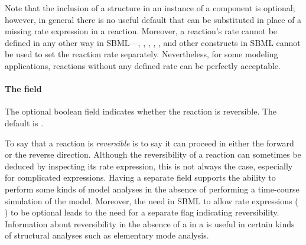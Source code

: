 Note that the inclusion of a \KineticLaw structure in an instance
of a \Reaction component is optional; however, in general there is
no useful default that can be substituted in place of a missing
rate expression in a reaction.  Moreover, a reaction's rate cannot
be defined in any other way in SBML---\InitialAssignment,
\AssignmentRule, \RateRule, \AlgebraicRule, \Event, and other
constructs in SBML cannot be used to set the reaction rate
separately.  Nevertheless, for some modeling applications,
reactions without any defined rate can be perfectly acceptable.


\paragraph{The  field}
\label{sec:reversible}

The optional boolean field  indicates whether
the reaction is reversible.  The default is .

To say that a reaction is \emph{reversible} is to say it can
proceed in either the forward or the reverse direction.  Although
the reversibility of a reaction can sometimes be deduced by
inspecting its rate expression, this is not always the case,
especially for complicated expressions.  Having a separate field
supports the ability to perform some kinds of model analyses in
the absence of performing a time-course simulation of the model.
Moreover, the need in SBML to allow rate expressions (\ie
\KineticLaw) to be optional leads to the need for a separate flag
indicating reversibility.  Information about reversibility in the
absence of a \KineticLaw in a \Reaction is useful in certain kinds
of structural analyses such as elementary mode analysis.

